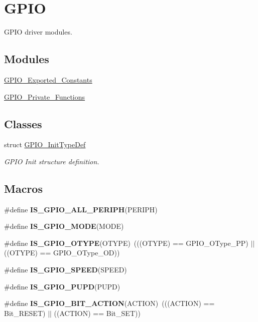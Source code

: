 \hypertarget{group___g_p_i_o}{}\section{G\+P\+IO}
\label{group___g_p_i_o}


G\+P\+IO driver modules.  


\subsection*{Modules}
\begin{DoxyCompactItemize}
\item 
\hyperlink{group___g_p_i_o___exported___constants}{G\+P\+I\+O\+\_\+\+Exported\+\_\+\+Constants}
\item 
\hyperlink{group___g_p_i_o___private___functions}{G\+P\+I\+O\+\_\+\+Private\+\_\+\+Functions}
\end{DoxyCompactItemize}
\subsection*{Classes}
\begin{DoxyCompactItemize}
\item 
struct \hyperlink{struct_g_p_i_o___init_type_def}{G\+P\+I\+O\+\_\+\+Init\+Type\+Def}
\begin{DoxyCompactList}\small\item\em G\+P\+IO Init structure definition. \end{DoxyCompactList}\end{DoxyCompactItemize}
\subsection*{Macros}
\begin{DoxyCompactItemize}
\item 
\#define {\bfseries I\+S\+\_\+\+G\+P\+I\+O\+\_\+\+A\+L\+L\+\_\+\+P\+E\+R\+I\+PH}(P\+E\+R\+I\+PH)
\item 
\#define {\bfseries I\+S\+\_\+\+G\+P\+I\+O\+\_\+\+M\+O\+DE}(M\+O\+DE)
\item 
\#define {\bfseries I\+S\+\_\+\+G\+P\+I\+O\+\_\+\+O\+T\+Y\+PE}(O\+T\+Y\+PE)~(((O\+T\+Y\+PE) == G\+P\+I\+O\+\_\+\+O\+Type\+\_\+\+PP) $\vert$$\vert$ ((O\+T\+Y\+PE) == G\+P\+I\+O\+\_\+\+O\+Type\+\_\+\+OD))\hypertarget{group___g_p_i_o_ga7145550a414f2b0455d79ddde6100af8}{}\label{group___g_p_i_o_ga7145550a414f2b0455d79ddde6100af8}

\item 
\#define {\bfseries I\+S\+\_\+\+G\+P\+I\+O\+\_\+\+S\+P\+E\+ED}(S\+P\+E\+ED)
\item 
\#define {\bfseries I\+S\+\_\+\+G\+P\+I\+O\+\_\+\+P\+U\+PD}(P\+U\+PD)
\item 
\#define {\bfseries I\+S\+\_\+\+G\+P\+I\+O\+\_\+\+B\+I\+T\+\_\+\+A\+C\+T\+I\+ON}(A\+C\+T\+I\+ON)~(((A\+C\+T\+I\+ON) == Bit\+\_\+\+R\+E\+S\+ET) $\vert$$\vert$ ((A\+C\+T\+I\+ON) == Bit\+\_\+\+S\+ET))\hypertarget{group___g_p_i_o_ga6b882caa8ed9857c5c7267959a7818c5}{}\label{group___g_p_i_o_ga6b882caa8ed9857c5c7267959a7818c5}

\end{DoxyCompactItemize}
